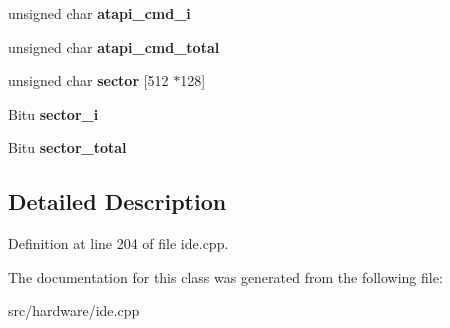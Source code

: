 \begin{DoxyCompactItemize}
\item 
\hypertarget{classIDEATAPICDROMDevice_a1e62a465becd556da27b8a060d8695fb}{unsigned char {\bfseries atapi\-\_\-cmd\-\_\-i}}\label{classIDEATAPICDROMDevice_a1e62a465becd556da27b8a060d8695fb}

\item 
\hypertarget{classIDEATAPICDROMDevice_a8cc1c7681f8c8c8e5ed93ef86995dd5a}{unsigned char {\bfseries atapi\-\_\-cmd\-\_\-total}}\label{classIDEATAPICDROMDevice_a8cc1c7681f8c8c8e5ed93ef86995dd5a}

\item 
\hypertarget{classIDEATAPICDROMDevice_a123cdf624128f5c142fc1f480e5ff91f}{unsigned char {\bfseries sector} \mbox{[}512 $\ast$128\mbox{]}}\label{classIDEATAPICDROMDevice_a123cdf624128f5c142fc1f480e5ff91f}

\item 
\hypertarget{classIDEATAPICDROMDevice_ad6b3e3413c5d7739939ca14eb1dff4b7}{Bitu {\bfseries sector\-\_\-i}}\label{classIDEATAPICDROMDevice_ad6b3e3413c5d7739939ca14eb1dff4b7}

\item 
\hypertarget{classIDEATAPICDROMDevice_a4a7e9b2a06f401201b6187679e2bbae5}{Bitu {\bfseries sector\-\_\-total}}\label{classIDEATAPICDROMDevice_a4a7e9b2a06f401201b6187679e2bbae5}

\end{DoxyCompactItemize}


\subsection{Detailed Description}


Definition at line 204 of file ide.\-cpp.



The documentation for this class was generated from the following file\-:\begin{DoxyCompactItemize}
\item 
src/hardware/ide.\-cpp\end{DoxyCompactItemize}
